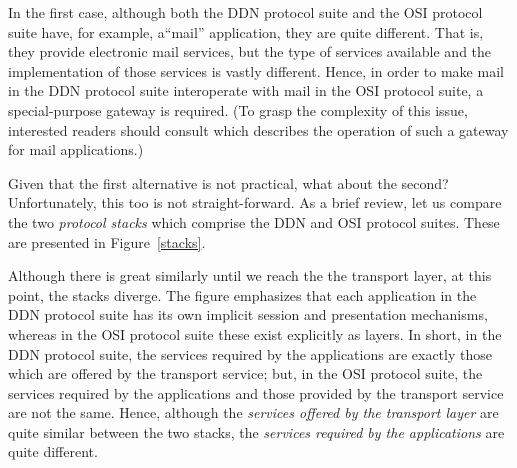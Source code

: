 In the first case,
although both the DDN protocol suite and the OSI protocol suite have,
for example,
a``mail'' application,
they are quite different.
That is, they provide electronic mail services,
but the type of services available and the implementation of those services
is vastly different.
Hence,
in order to make mail in the DDN protocol suite interoperate with mail in the
OSI protocol suite,
a special-purpose gateway is required.
(To grasp the complexity of this issue,
interested readers should consult \cite{ARPA.MHS} which describes the
operation of such a gateway for mail applications.)

Given that the first alternative is not practical,
what about the second?
Unfortunately,
this too is not straight-forward.
As a brief review,
let us compare the two {\em protocol stacks\/} which comprise the
DDN and OSI protocol suites.
These are presented in Figure~\ref{stacks}.

Although there is great similarly until we reach the the transport layer,
at this point,
the stacks diverge.
The figure emphasizes that
each application in the DDN protocol suite has its own implicit session and
presentation mechanisms,
whereas in the OSI protocol suite these exist explicitly as layers.
In short,
in the DDN protocol suite,
the services required by the applications are exactly those which are offered
by the transport service;
but,
in the OSI protocol suite,
the services required by the applications and those provided by the transport
service are not the same.
Hence,
although the {\em services offered by the transport layer\/} are quite similar
between the two stacks,
the {\em services required by the applications\/} are quite different.
